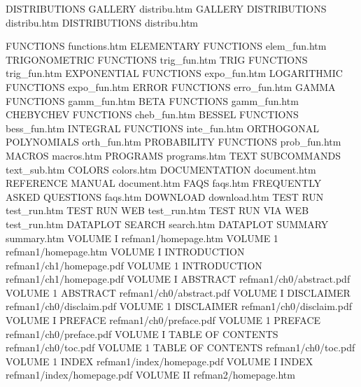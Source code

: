 DISTRIBUTIONS GALLERY                   distribu.htm
GALLERY DISTRIBUTIONS                   distribu.htm
DISTRIBUTIONS                           distribu.htm

FUNCTIONS                               functions.htm
ELEMENTARY FUNCTIONS                    elem_fun.htm
TRIGONOMETRIC FUNCTIONS                 trig_fun.htm
TRIG FUNCTIONS                          trig_fun.htm
EXPONENTIAL FUNCTIONS                   expo_fun.htm
LOGARITHMIC FUNCTIONS                   expo_fun.htm
ERROR FUNCTIONS                         erro_fun.htm
GAMMA FUNCTIONS                         gamm_fun.htm
BETA FUNCTIONS                          gamm_fun.htm
CHEBYCHEV FUNCTIONS                     cheb_fun.htm
BESSEL FUNCTIONS                        bess_fun.htm
INTEGRAL FUNCTIONS                      inte_fun.htm
ORTHOGONAL POLYNOMIALS                  orth_fun.htm
PROBABILITY FUNCTIONS                   prob_fun.htm
MACROS                                  macros.htm
PROGRAMS                                programs.htm
TEXT SUBCOMMANDS                        text_sub.htm
COLORS                                  colors.htm
DOCUMENTATION                           document.htm
REFERENCE MANUAL                        document.htm
FAQS                                    faqs.htm
FREQUENTLY ASKED QUESTIONS              faqs.htm
DOWNLOAD                                download.htm
TEST RUN                                test_run.htm
TEST RUN WEB                            test_run.htm
TEST RUN VIA WEB                        test_run.htm
DATAPLOT SEARCH                         search.htm
DATAPLOT SUMMARY                        summary.htm
VOLUME I                                refman1/homepage.htm
VOLUME 1                                refman1/homepage.htm
VOLUME I INTRODUCTION                   refman1/ch1/homepage.pdf
VOLUME 1 INTRODUCTION                   refman1/ch1/homepage.pdf
VOLUME I ABSTRACT                       refman1/ch0/abstract.pdf
VOLUME 1 ABSTRACT                       refman1/ch0/abstract.pdf
VOLUME I DISCLAIMER                     refman1/ch0/disclaim.pdf
VOLUME 1 DISCLAIMER                     refman1/ch0/disclaim.pdf
VOLUME I PREFACE                        refman1/ch0/preface.pdf
VOLUME 1 PREFACE                        refman1/ch0/preface.pdf
VOLUME I TABLE OF CONTENTS              refman1/ch0/toc.pdf
VOLUME 1 TABLE OF CONTENTS              refman1/ch0/toc.pdf
VOLUME 1 INDEX                          refman1/index/homepage.pdf
VOLUME I INDEX                          refman1/index/homepage.pdf
VOLUME II                               refman2/homepage.htm
